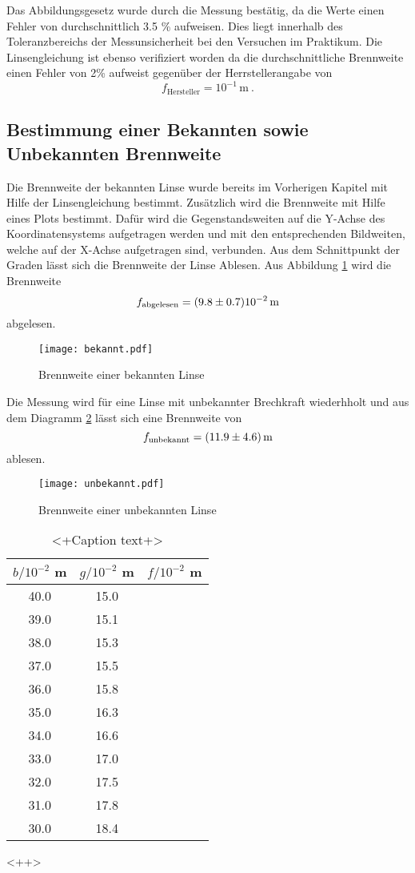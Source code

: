 Das Abbildungsgesetz wurde durch die Messung bestätig, da die Werte einen Fehler von durchschnittlich 3.5 \% aufweisen. Dies liegt innerhalb des Toleranzbereichs der Messunsicherheit bei den Versuchen im Praktikum. Die Linsengleichung ist ebenso verifiziert worden da die durchschnittliche Brennweite einen Fehler von 2\% aufweist gegenüber der Herrstellerangabe von 
\begin{equation}
  f_\text{Hersteller} = 10^{-1} \, \text{m} \ .
  \label{eqn:fHer1}
\end{equation}
\subsection{Bestimmung einer Bekannten sowie Unbekannten Brennweite}
Die Brennweite der bekannten Linse wurde bereits im Vorherigen Kapitel mit Hilfe der Linsengleichung bestimmt. Zusätzlich wird die Brennweite mit Hilfe eines Plots bestimmt. Dafür wird die Gegenstandsweiten auf die Y-Achse des Koordinatensystems aufgetragen werden und mit den entsprechenden Bildweiten, welche auf der X-Achse aufgetragen sind, verbunden. Aus dem Schnittpunkt der Graden lässt sich die Brennweite der Linse Ablesen. Aus Abbildung \ref{fig:fibek} wird die Brennweite
\begin{equation}
  f_\text{abgelesen} = (\num{9.8 +- 0.7}) 10^{-2} \, \text{m}
  \label{eqn:fbek}
\end{equation}
abgelesen. 
\begin{figure}
  \centering
  \texttt{[image: bekannt.pdf]}
  \caption{Brennweite einer bekannten Linse}
  \label{fig:fibek}
\end{figure}
Die Messung wird für eine Linse mit unbekannter Brechkraft wiederhholt und aus dem Diagramm \ref{fig:fiunb} lässt sich eine Brennweite von 
\begin{equation}
  f_\text{unbekannt} = (\num{11.9 +- 4.6}) \, \text{m}
  \label{eqn:unb}
\end{equation}
ablesen.
\begin{figure}
  \centering
  \texttt{[image: unbekannt.pdf]}
  \caption{Brennweite einer unbekannten Linse}
  \label{fig:fiunb}
\end{figure}
\begin{table}
  \centering
  \begin{tabular}{c c| c}
    \toprule
    $b/10^{-2}$ m & $g/10^{-2}$ m & $f/10^{-2}$ m\\
    \midrule
	40.0	& 15.0	& 	\\
	39.0	& 15.1	&	\\
	38.0	& 15.3	&	\\
	37.0	& 15.5	&	\\
	36.0	& 15.8	&	\\
	35.0	& 16.3	&	\\
	34.0	& 16.6	&	\\
	33.0	& 17.0	&	\\
	32.0	& 17.5	&	\\
	31.0	& 17.8	&	\\
	30.0	& 18.4	&	\\
    \bottomrule
  \end{tabular}
  \caption{<+Caption text+>}
  \label{tab:<+label+>}
\end{table}<++>
